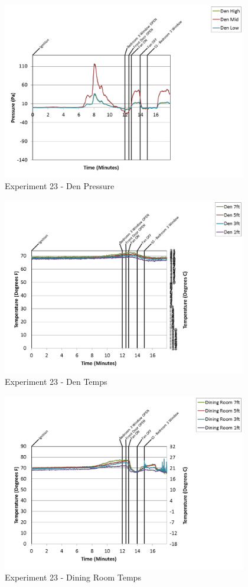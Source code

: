 \documentclass{article}
\begin{document}
\begin{appendices}
\begin{figure}[h!]
	\centering
	\includegraphics[height=3.05in]{0_Images/Results_Charts/Exp_23_Charts/DenPressure.png}
	\caption{Experiment 23 - Den Pressure}
\end{figure}

\clearpage

\begin{figure}[h!]
	\centering
	\includegraphics[height=3.05in]{0_Images/Results_Charts/Exp_23_Charts/DenTemps.png}
	\caption{Experiment 23 - Den Temps}
\end{figure}


\begin{figure}[h!]
	\centering
	\includegraphics[height=3.05in]{0_Images/Results_Charts/Exp_23_Charts/DiningRoomTemps.png}
	\caption{Experiment 23 - Dining Room Temps}
\end{figure}


\end{appendices}
\end{document}
